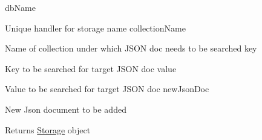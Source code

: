db\+Name
\begin{DoxyItemize}
\item Unique handler for storage name  collection\+Name
\item Name of collection under which J\+S\+O\+N doc needs to be searched  key
\item Key to be searched for target J\+S\+O\+N doc  value
\item Value to be searched for target J\+S\+O\+N doc  new\+Json\+Doc
\item New Json document to be added
\end{DoxyItemize}

\begin{DoxyReturn}{Returns}
\hyperlink{class_storage}{Storage} object 
\end{DoxyReturn}
